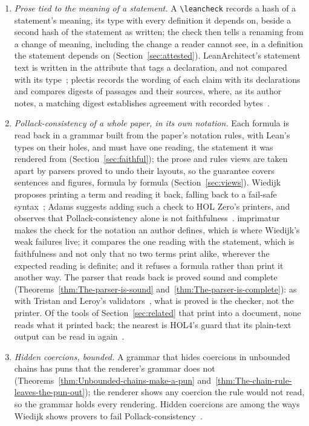 \documentclass[acmsmall,screen,review,anonymous,nonacm]{acmart}
\begin{document}
\begin{enumerate}
\item \emph{Prose tied to the meaning of a statement.} A \verb|\leancheck|
  records a hash of a statement's meaning, its type with every definition
  it depends on, beside a second hash of the statement as written; the
  check then tells a renaming from a change of meaning, including the
  change a reader cannot see, in a definition the statement depends on
  (Section~\ref{sec:attested}). LeanArchitect's statement text is
  written in the attribute that tags a declaration, and not compared with
  its type~\cite{Zhu26}; plectis records the wording of each claim with its
  declarations and compares digests of passages and their sources, where,
  as its author notes, a matching digest establishes agreement with
  recorded bytes~\cite{Cook26}.
\item \emph{Pollack-consistency of a whole paper, in its own notation.}
  Each formula is read back in a grammar built from the paper's notation
  rules, with Lean's types on their holes, and must have one reading, the
  statement it was rendered from (Section~\ref{sec:faithful}); the prose
  and rules views are taken apart by parsers proved to undo their layouts,
  so the guarantee covers sentences and figures, formula by formula
  (Section~\ref{sec:views}). Wiedijk proposes printing a term and reading
  it back, falling back to a fail-safe syntax~\cite{Wiedijk12}; Adams
  suggests adding such a check to HOL Zero's printers, and observes that
  Pollack-consistency alone is not faithfulness~\cite{Adams16}. imprimatur
  makes the check for the notation an author defines, which is where
  Wiedijk's weak failures live; it compares the one reading with the
  statement, which is faithfulness and not only that no two terms print
  alike, wherever the expected reading is definite; and it refuses a
  formula rather than print it another way. The parser that reads back is
  proved sound and complete (Theorems~\ref{thm:The-parser-is-sound}
  and~\ref{thm:The-parser-is-complete}): as with Tristan and Leroy's
  validators~\cite{Tristan08}, what is proved is the checker, not the
  printer. Of the tools of Section~\ref{sec:related} that print into a
  document, none reads what it printed back; the nearest is HOL4's guard
  that its plain-text output can be read in again~\cite{HOL25}.
\item \emph{Hidden coercions, bounded.} A grammar that hides coercions in
  unbounded chains has puns that the renderer's grammar does not
  (Theorems~\ref{thm:Unbounded-chains-make-a-pun}
  and~\ref{thm:The-chain-rule-leaves-the-pun-out}); the renderer shows any
  coercion the rule would not read, so the grammar holds every rendering.
  Hidden coercions are among the ways Wiedijk shows provers to fail
  Pollack-consistency~\cite{Wiedijk12}.
\end{enumerate}
\end{document}
